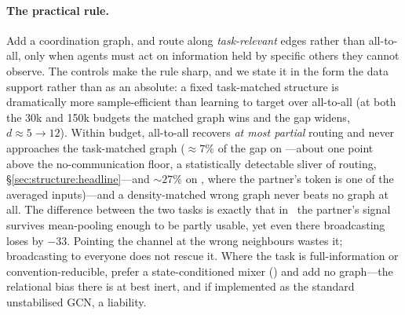 \paragraph{The practical rule.} Add a coordination graph, and route along
\emph{task-relevant} edges rather than all-to-all, only when agents must act
on information held by specific others they cannot observe. The controls make
the rule sharp, and we state it in the form the data support rather than as an
absolute: a fixed task-matched structure is dramatically more sample-efficient
than learning to target over all-to-all (at both the 30k and 150k budgets the
matched graph wins and the gap widens, $d{\approx}5\!\to\!12$). Within budget,
all-to-all recovers
\emph{at most partial} routing and never approaches the task-matched graph
(${\approx}7\%$ of the gap on \pairrouting---about one point above the
no-communication floor, a statistically detectable sliver of routing,
\S\ref{sec:structure:headline}---and ${\sim}27\%$ on \tokenmatch, where the
partner's token is one of the averaged
inputs)---and a density-matched wrong graph never beats no graph at all. The
difference between the two tasks is exactly that in \tokenmatch\ the partner's
signal survives mean-pooling enough to be partly usable, yet even there
broadcasting loses by $-33$. Pointing the channel at the wrong neighbours wastes
it; broadcasting to everyone does not rescue it. Where the
task is full-information or convention-reducible, prefer a state-conditioned
mixer (\qmix) and add no graph---the relational bias there is at best inert,
and if implemented as the standard unstabilised GCN, a liability.

